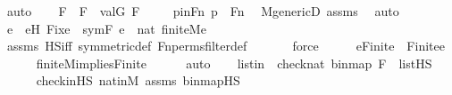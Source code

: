 \begin{isabellebody}
\ auto\isanewline
\isanewline
\ \ \isamarkupfalse%
\ F\ \ {\isachardoublequoteopen}F\ {\isasymequiv}\ val{\isacharparenleft}{\kern0pt}G{\isacharcomma}{\kern0pt}\ F{\isacharprime}{\kern0pt}{\isacharparenright}{\kern0pt}{\isachardoublequoteclose}\ \isanewline
\isanewline
\ \ \isamarkupfalse%
\ p{}inFn\ {\isacharcolon}{\kern0pt}{\isachardoublequoteopen}p{}\ {\isasymin}\ Fn{\isachardoublequoteclose}\ \isamarkupfalse%
\ M{\isacharunderscore}{\kern0pt}genericD\ assms\ \isamarkupfalse%
\ auto\isanewline
\isanewline
\ \ \isamarkupfalse%
\ e\ \ eH{\isacharcolon}{\kern0pt}\ {\isachardoublequoteopen}Fix{\isacharparenleft}{\kern0pt}e{\isacharparenright}{\kern0pt}\ {\isasymsubseteq}\ sym{\isacharparenleft}{\kern0pt}F{\isacharprime}{\kern0pt}{\isacharparenright}{\kern0pt}{\isachardoublequoteclose}\ {\isachardoublequoteopen}e\ {\isasymsubseteq}\ nat{\isachardoublequoteclose}\ {\isachardoublequoteopen}finite{\isacharunderscore}{\kern0pt}M{\isacharparenleft}{\kern0pt}e{\isacharparenright}{\kern0pt}{\isachardoublequoteclose}\ \ \isanewline
\ \ \ \ \isamarkupfalse%
\ assms\ HS{\isacharunderscore}{\kern0pt}iff\ symmetric{\isacharunderscore}{\kern0pt}def\ Fn{\isacharunderscore}{\kern0pt}perms{\isacharunderscore}{\kern0pt}filter{\isacharunderscore}{\kern0pt}def\ \isanewline
\ \ \ \ \isamarkupfalse%
\ force\isanewline
\ \ \isamarkupfalse%
\ \isamarkupfalse%
\ e{\isacharunderscore}{\kern0pt}Finite\ {\isacharcolon}{\kern0pt}\ {\isachardoublequoteopen}Finite{\isacharparenleft}{\kern0pt}e{\isacharparenright}{\kern0pt}{\isachardoublequoteclose}\ \isanewline
\ \ \ \ \isamarkupfalse%
\ finite{\isacharunderscore}{\kern0pt}M{\isacharunderscore}{\kern0pt}implies{\isacharunderscore}{\kern0pt}Finite\isanewline
\ \ \ \ \isamarkupfalse%
\ auto\isanewline
\isanewline
\ \ \isamarkupfalse%
\ listin\ {\isacharcolon}{\kern0pt}\ {\isachardoublequoteopen}{\isacharbrackleft}{\kern0pt}check{\isacharparenleft}{\kern0pt}nat{\isacharparenright}{\kern0pt}{\isacharcomma}{\kern0pt}\ binmap{\isacharprime}{\kern0pt}{\isacharcomma}{\kern0pt}\ F{\isacharprime}{\kern0pt}{\isacharbrackright}{\kern0pt}\ {\isasymin}\ list{\isacharparenleft}{\kern0pt}HS{\isacharparenright}{\kern0pt}{\isachardoublequoteclose}\ \isanewline
\ \ \ \ \isamarkupfalse%
\ check{\isacharunderscore}{\kern0pt}in{\isacharunderscore}{\kern0pt}HS\ nat{\isacharunderscore}{\kern0pt}in{\isacharunderscore}{\kern0pt}M\ assms\ binmap{\isacharprime}{\kern0pt}{\isacharunderscore}{\kern0pt}HS\isanewline

\end{isabellebody}

